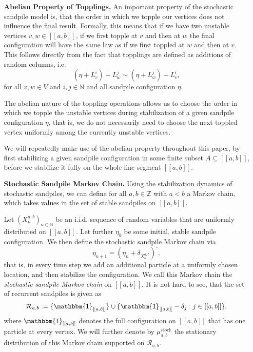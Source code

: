 \documentclass[11pt]{article}
\newcommand{\N}{\mathbb{N}}
\newcommand{\Z}{\mathbb{Z}}
\newcommand{\stoch}{\text{stoch}}
\newcommand{\stat}[2]{\mu^{\stoch}_{#1,#2}}
\newcommand{\one}{\mathbbm{1}}
\begin{document}
\textbf{Abelian Property of Topplings.} An important property of the stochastic sandpile model is, that the order in which we topple our vertices does not influence the final result. Formally, this means that if we have two unstable vertices $v,w\in [[a,b]]$, if we first topple at $v$ and then at $w$ the final configuration will have the same law as if we first toppled at $w$ and then at $v$. This follows directly from the fact that topplings are defined as additions of random columns, i.e.
$$(\eta+L_v^i)+L_w^j\sim (\eta+L_w^j)+L_v^i,$$
for all $v,w\in V$ and $i,j\in\N$ and all sandpile configuration $\eta$.

The abelian nature of the toppling operations allows us to choose the order in which we topple the unstable vertices during stabilization of a given sandpile configuration $\eta$, that is, we do not necessarily need to choose the next toppled vertex uniformly among the currently unstable vertices.

We will repeatedly make use of the abelian property throughout this paper, by first stabilizing a given sandpile configuration in some finite subset $A\subseteq [[a,b]]$, before we stabilize it fully on the whole line segment $[[a,b]].$

\textbf{Stochastic Sandpile Markov Chain.} Using the stabilization dynamics of stochastic sandpiles, we can define for all $a,b\in\Z$ with $a<b$ a Markov chain, which takes values in the set of stable sandpiles on $[[a,b]].$

Let $(X_n^{a,b})_{n\in\N}$ be an i.i.d. sequence of random variables that are uniformly distributed on $[[a,b]].$ Let further $\eta_0$ be some initial, stable sandpile configuration. We then define the stochastic sandpile Markov chain via
$$\eta_{n+1}=(\eta_n+\delta_{X_n^{a,b}})^\circ,$$
that is, in every time step we add an additional particle at a uniformly chosen location, and then stabilize the configuration. We call this Markov chain the {\it stochastic sandpile Markov chain} on $[[a,b]]$. It is not hard to see, that the set of recurrent sandpiles is given as
$$\mathcal{R}_{a,b}:=\{\one_{[[a,b]]}\}\cup\{\one_{[[a,b]]}-\delta_j:j\in[[a,b]]\},$$
where $\one_{[[a,b]]}$ denotes the full configuration on $[[a,b]]$ that has one particle at every vertex. We will further denote by $\stat{a}{b}$ the stationary distribution of this Markov chain supported on $\mathcal{R}_{a,b}.$
\end{document}
